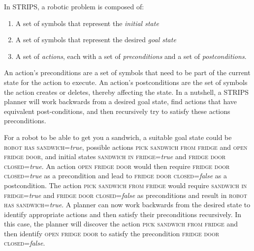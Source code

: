 In STRIPS, a robotic problem is composed of:

\begin{enumerate}
\item A set of symbols that represent the \textsl{initial state}
\item A set of symbols that represent the desired \textsl{goal state}
\item A set of \textsl{actions}, each with a set of \textsl{preconditions} and a set of \textsl{postconditions}.
\end{enumerate}

An action's preconditions are a set of symbols that need to be part of the current state for the action to execute. An action's postconditions are the set of symbols the action creates or deletes, thereby affecting the state. In a nutshell, a STRIPS planner will work backwards from a desired goal state, find actions that have equivalent post-conditions, and then recursively try to satisfy these actions preconditions.

For a robot to be able to get you a sandwich, a suitable goal state could be \textsc{robot has sandwich}=\textsl{true}, possible actions \textsc{pick sandwich from fridge} and \textsc{open fridge door}, and initial states \textsc{sandwich in fridge}=\textsl{true} and \textsc{fridge door closed}=\textsl{true}.  An action \textsc{open fridge door} would then require \textsc{fridge door closed}=\textsl{true} as a precondition and lead to \textsc{fridge door closed}=\textsl{false} as a postcondition. The action \textsc{pick sandwich from fridge} would require \textsc{sandwich in fridge}=\textsl{true} and \textsc{fridge door closed}=\textsl{false} as preconditions and result in \textsc{robot has sandwich}=\textsl{true}. A planner can now work backwards from the desired state to identify appropriate actions and then satisfy their preconditions recursively. In this case, the planner will discover the action \textsc{pick sandwich from fridge} and then identify \textsc{open fridge door} to satisfy the precondition \textsc{fridge door closed}=\textsl{false}.





